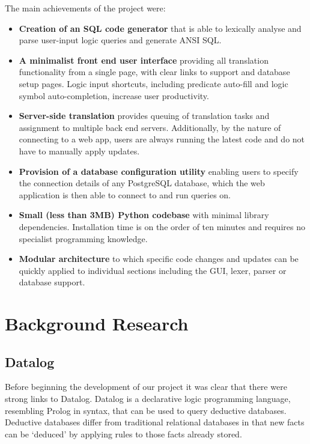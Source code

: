 \documentclass[a4paper, 11pt]{article}
\begin{document}
    The main achievements of the project were:

    \begin{itemize}
      \item \textbf{Creation of an SQL code generator} that is able to lexically
      analyse and parse user-input logic queries and generate ANSI SQL.

      \item \textbf{A minimalist front end user interface} providing all
      translation functionality from a single page, with clear links to
      support and database setup pages. Logic input shortcuts, including
      predicate auto-fill and logic symbol auto-completion, increase user
      productivity.

      \item \textbf{Server-side translation} provides queuing of translation
      tasks and assignment to multiple back end servers. Additionally, by the
      nature of connecting to a web app, users are always running the latest
      code and do not have to manually apply updates.

      \item \textbf{Provision of a database configuration utility} enabling
      users to specify the connection details of any PostgreSQL database, which
      the web application is then able to connect to and run queries on.

      \item \textbf{Small (less than 3MB) Python codebase} with minimal
      library dependencies. Installation time is on the order of ten minutes
      and requires no specialist programming knowledge.

      \item \textbf{Modular architecture} to which specific code changes
      and updates can be quickly applied to individual sections including the
      GUI, lexer, parser or database support.
    \end{itemize}

\section{Background Research}
  \label{sec:background}

  \subsection{Datalog}
    Before beginning the development of our project it was clear that there were
    strong links to Datalog. Datalog is a declarative logic programming language,
    resembling Prolog in syntax, that can be used to query deductive databases.
    Deductive databases differ from traditional relational databases in that
    new facts can be `deduced' by applying rules to those facts already stored. \cite{datalogFariba}
\end{document}
